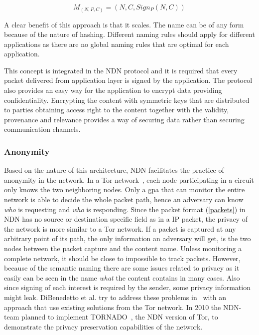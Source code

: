 \begin{equation}\label{eq:mapping_name-content}
M_{(N, P, C)} = (N,C,Sign_{P}(N,C))
\end{equation}

A clear benefit of this approach is that it scales. 
The \gls{name} can be of any form because of the nature of hashing. 
Different naming rules should apply for different applications as there are no global naming rules that are optimal for each application.

This concept is integrated in the \gls{NDN} protocol and it is required that every packet delivered from application layer is signed by the application.
The protocol also provides an easy way for the application to encrypt data providing confidentiality.
Encrypting the content with symmetric keys that are distributed to parties obtaining access right to the content together with the validity, provenance and relevance provides a way of securing data rather than securing communication channels.

\subsubsection{Anonymity}
Based on the nature of this architecture, \gls{NDN} facilitates the practice of anonymity in the network. 
In a Tor network~\cite{DBLP:conf/uss/DingledineMS04}, each node participating in a circuit only knows the two neighboring nodes.
Only a \gls{gpa} that can monitor the entire network is able to decide the whole packet path, hence an adversary can know \textit{who} is requesting and \textit{who} is responding.
Since the packet format (\autoref{packets}) in \gls{NDN} has no source or destination specific field as in a \gls{IP} packet, the privacy of the network is more similar to a Tor network.
If a packet is captured at any arbitrary point of its path, the only information an adversary will get, is the two nodes between the packet capture and the content \gls{name}. 
Unless monitoring a complete network, it should be close to impossible to track packets.  
However, because of the semantic naming there are some issues related to privacy as it easily can be seen in the \gls{name} \textit{what} the content contains in many cases.
Also since signing of each \gls{interest} is required by the sender, some privacy information might leak.
DiBenedetto et al. try to address these problems in~\cite{DBLP:conf/ndss/DiBenedettoGTU12} with an approach that use existing solutions from the Tor network.
In 2010 the \gls{NDN}-team planned to implement TORNADO~\cite[Section 3.7]{NDN-0001}, the \gls{NDN} version of Tor, to demonstrate the privacy preservation capabilities of the network.

